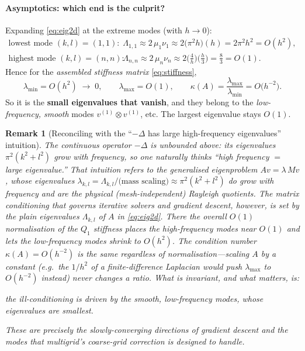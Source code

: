 \documentclass[11pt]{article}
\newtheorem{remark}{Remark}
\newcommand{\kk}{\kappa}
\begin{document}
\paragraph{Asymptotics: which end is the culprit?}
Expanding \eqref{eq:eig2d} at the extreme modes (with $h\to0$):
\begin{align}
  \text{lowest mode }(k,l)=(1,1):\quad
    &\Lambda_{1,1} \approx 2\,\mu_1\nu_1 \approx 2\big(\pi^2 h\big)(h) = 2\pi^2 h^2 = O(h^2),\\
  \text{highest mode }(k,l)=(n,n):\quad
    &\Lambda_{n,n} \approx 2\,\mu_n\nu_n \approx 2\Big(\tfrac{4}{h}\Big)\Big(\tfrac{h}{3}\Big)
       = \tfrac{8}{3} = O(1).
\end{align}
Hence for the \emph{assembled stiffness matrix} \eqref{eq:stiffness},
\begin{equation}
  \lambda_{\min} = O(h^2)\;\longrightarrow\;0,
  \qquad
  \lambda_{\max} = O(1),
  \qquad
  \kk(A) = \frac{\lambda_{\max}}{\lambda_{\min}} = O\!\big(h^{-2}\big).
  \label{eq:condA}
\end{equation}
So it is the \textbf{small eigenvalues that vanish}, and they belong to the
\emph{low-frequency, smooth} modes $v^{(1)}\otimes v^{(1)}$, etc. The largest eigenvalue
stays $O(1)$.

\begin{remark}[Reconciling with the ``$-\Delta$ has large high-frequency eigenvalues'' intuition]
The continuous operator $-\Delta$ is unbounded \emph{above}: its eigenvalues
$\pi^2(k^2+l^2)$ grow with frequency, so one naturally thinks ``high frequency $=$ large
eigenvalue.'' That intuition refers to the \emph{generalised} eigenproblem
$A v = \lambda\,M v$, whose eigenvalues $\lambda_{k,l}=\Lambda_{k,l}/\text{(mass scaling)}
\approx \pi^2(k^2+l^2)$ do grow with frequency and are the physical (mesh-independent)
Rayleigh quotients. The \emph{matrix} conditioning that governs iterative solvers and
gradient descent, however, is set by the plain eigenvalues $\Lambda_{k,l}$ of $A$ in
\eqref{eq:eig2d}. There the overall $O(1)$ normalisation of the $Q_1$ stiffness places the
high-frequency modes near $O(1)$ and lets the low-frequency modes shrink to $O(h^2)$. The
condition number $\kk(A)=O(h^{-2})$ is the same regardless of normalisation---scaling $A$
by a constant (e.g.\ the $1/h^2$ of a finite-difference Laplacian would push
$\lambda_{\max}$ to $O(h^{-2})$ instead) never changes a ratio. What is invariant, and what
matters, is:
\begin{center}
\emph{the ill-conditioning is driven by the smooth, low-frequency modes, whose eigenvalues
are smallest.}
\end{center}
These are precisely the slowly-converging directions of gradient descent and the modes that
multigrid's coarse-grid correction is designed to handle.
\end{remark}
\end{document}
